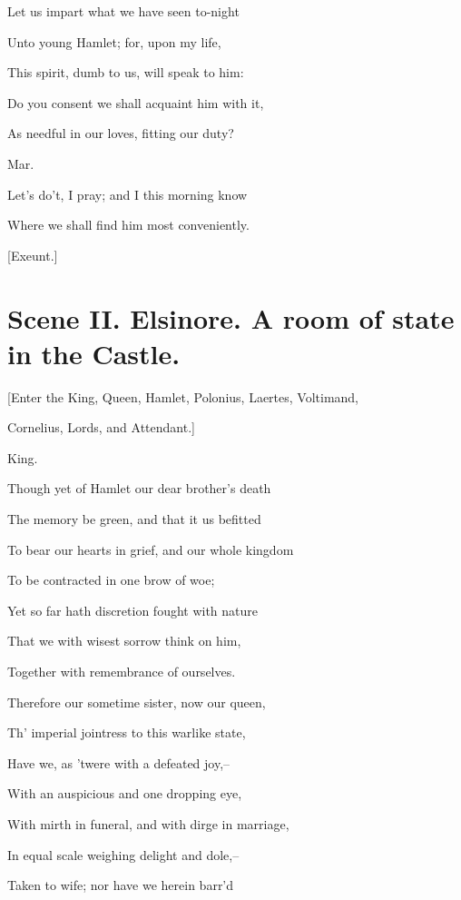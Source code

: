 \documentclass[12pt]{book}
\begin{document}
Let us impart what we have seen to-night

Unto young Hamlet; for, upon my life,

This spirit, dumb to us, will speak to him:

Do you consent we shall acquaint him with it,

As needful in our loves, fitting our duty?



Mar.

Let's do't, I pray; and I this morning know

Where we shall find him most conveniently.



[Exeunt.]







\section*{Scene II. Elsinore. A room of state in the Castle.}



[Enter the King, Queen, Hamlet, Polonius, Laertes, Voltimand,

Cornelius, Lords, and Attendant.]



King.

Though yet of Hamlet our dear brother's death

The memory be green, and that it us befitted

To bear our hearts in grief, and our whole kingdom

To be contracted in one brow of woe;

Yet so far hath discretion fought with nature

That we with wisest sorrow think on him,

Together with remembrance of ourselves.

Therefore our sometime sister, now our queen,

Th' imperial jointress to this warlike state,

Have we, as 'twere with a defeated joy,--

With an auspicious and one dropping eye,

With mirth in funeral, and with dirge in marriage,

In equal scale weighing delight and dole,--

Taken to wife; nor have we herein barr'd
\end{document}
